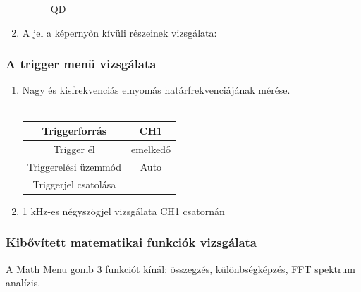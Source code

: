 \documentclass[10pt,a4paper]{article}
\begin{document}
\begin{enumerate}
\begin{figure}[hbtp]
				\caption{QD}
				\end{figure}
				\item A jel a képernyőn kívüli részeinek vizsgálata: $$$$ $$$$ $$$$
			\end{enumerate}
			\subsubsection{A trigger menü vizsgálata}
			\begin{enumerate}
				\item Nagy és kisfrekvenciás elnyomás határfrekvenciájának mérése.\\\\\begin{tabular}{|c|c|}
				\hline 
				Triggerforrás & CH1 \\ 
				\hline 
				Trigger él & emelkedő \\ 
				\hline 
				Triggerelési üzemmód & Auto \\ 
				\hline 
				Triggerjel csatolása & $$$$ \\ 
				\hline 
				\end{tabular}  
				\item 1 kHz-es négyszögjel vizsgálata CH1 csatornán$$$$
			\end{enumerate}
			\subsubsection{Kibővített matematikai funkciók vizsgálata}
			A Math Menu gomb 3 funkciót kínál: összegzés, különbségképzés, FFT spektrum analízis.
\end{document}
